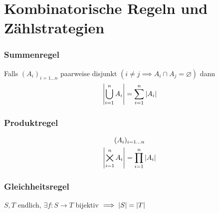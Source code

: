 \section{Kombinatorische Regeln und Zählstrategien}
\subsubsection{Summenregel}
Falls $(A_i)_{i=1 \dots n}$ paarweise disjunkt $(i \neq j \implies A_i \cap A_j = \varnothing )$ dann \\
\[ \abs{\bigcup_{i=1}^n A_i} = \sum_{i=1}^n \abs{A_i} \]

\subsubsection{Produktregel}
\begin{gather*}
	(A_i)_{i=1 \dots n} \\
	\abs{\bigtimes_{i=1}^n A_i} = \prod_{i=1}^n \abs{A_i}
\end{gather*}

\subsubsection{Gleichheitsregel}
$S, T$ endlich, $\exists f: S \rightarrow T$ bijektiv $\implies \abs{S} = \abs{T}$

